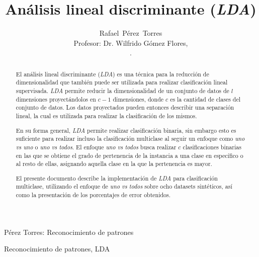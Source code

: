 \documentclass[journal]{IEEEtran}
\begin{document}

\title{Análisis lineal discriminante (\emph{LDA})}

\author{Rafael~Pérez~Torres \\
	Profesor: Dr. Wilfrido Gómez Flores,\\[6pt].
	
}

%
{Pérez Torres: Reconocimiento de patrones}

\maketitle

\begin{abstract}
El análisis lineal discriminante (\emph{LDA}) es una técnica para la reducción de dimensionalidad que también puede ser utilizada para realizar clasificación lineal supervisada.
\emph{LDA} permite reducir la dimensionalidad de un conjunto de datos de $l$ dimensiones proyectándolos en $c-1$ dimensiones, donde $c$ es la cantidad de clases del conjunto de datos.
Los datos proyectados pueden entonces describir una separación lineal, la cual es utilizada para realizar la clasificación de los mismos.

En su forma general, \emph{LDA} permite realizar clasificación binaria, sin embargo esto es suficiente para realizar incluso la clasificación multiclase al seguir un enfoque como \emph{uno vs uno} o \emph{uno vs todos}.
El enfoque \emph{uno vs todos} busca realizar $c$ clasificaciones binarias en las que se obtiene el grado de pertenencia de la instancia a una clase en específico o al resto de ellas, asignando aquella clase en la que la pertenencia es mayor.

El presente documento describe la implementación de \emph{LDA} para clasificación multiclase, utilizando el enfoque de \emph{uno vs todos} sobre ocho datasets sintéticos, así como la presentación de los porcentajes de error obtenidos.
\end{abstract}

\begin{IEEEkeywords}
Reconocimiento de patrones, LDA
\end{IEEEkeywords}
\end{document}
